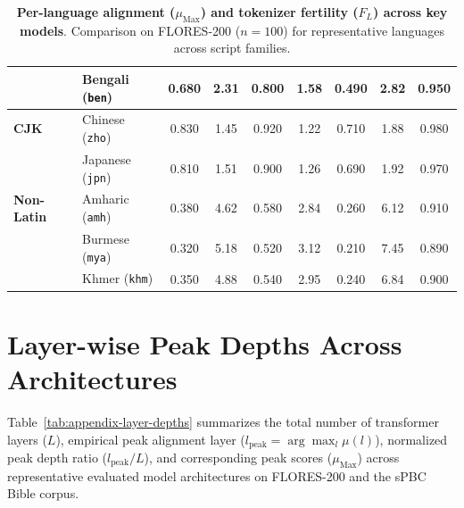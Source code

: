 \begin{table}[H]
\begin{tabular}{@{}llccccccc@{}}
  & Bengali (\texttt{ben}) & 0.680 & 2.31 & 0.800 & 1.58 & 0.490 & 2.82 & 0.950 \\
\midrule
\textbf{CJK} 
  & Chinese (\texttt{zho}) & 0.830 & 1.45 & 0.920 & 1.22 & 0.710 & 1.88 & 0.980 \\
  & Japanese (\texttt{jpn}) & 0.810 & 1.51 & 0.900 & 1.26 & 0.690 & 1.92 & 0.970 \\
\midrule
\textbf{Non-Latin} 
  & Amharic (\texttt{amh}) & 0.380 & 4.62 & 0.580 & 2.84 & 0.260 & 6.12 & 0.910 \\
  & Burmese (\texttt{mya}) & 0.320 & 5.18 & 0.520 & 3.12 & 0.210 & 7.45 & 0.890 \\
  & Khmer (\texttt{khm}) & 0.350 & 4.88 & 0.540 & 2.95 & 0.240 & 6.84 & 0.900 \\
\bottomrule
\end{tabular}
\caption{\textbf{Per-language alignment ($\mu_{\text{Max}}$) and tokenizer fertility ($F_L$) across key models}. Comparison on FLORES-200 ($n = 100$) for representative languages across script families.}
\label{tab:appendix-per-lang-scores}
\end{table}

\clearpage
\section{Layer-wise Peak Depths Across Architectures}
\label{sec:appendix-layer-depths}

Table~\ref{tab:appendix-layer-depths} summarizes the total number of transformer layers ($L$), empirical peak alignment layer ($l_{\text{peak}} = \arg\max_{l} \mu(l)$), normalized peak depth ratio ($l_{\text{peak}} / L$), and corresponding peak scores ($\mu_{\text{Max}}$) across representative evaluated model architectures on FLORES-200 and the sPBC Bible corpus.

